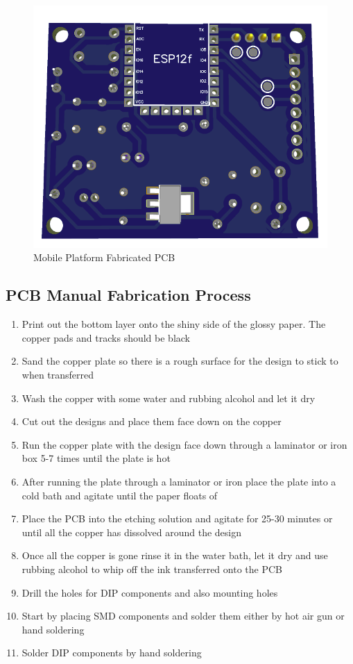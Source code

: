 
\begin{figure}[H]
    \centering
    \includegraphics[scale=0.5]{Figures/HMpcb_bottom.png}
    \caption{Mobile Platform Fabricated PCB}
    \label{fig:mobileplatformfabricatedpcb}
\end{figure}

\subsection{PCB Manual Fabrication Process}
\label{sec:PCBfab}
\begin{enumerate}
    \item Print out the bottom layer onto the shiny side of the glossy paper. The copper pads and tracks should be black
    \item Sand the copper plate so there is a rough surface for the design to stick to when transferred
    \item Wash the copper with some water and rubbing alcohol and let it dry
    \item Cut out the designs and place them face down on the copper
    \item Run the copper plate with the design face down through a laminator or iron box 5-7 times until the plate is hot
    \item After running the plate through a laminator or iron place the plate into a cold bath and agitate until the paper floats of
    \item Place the PCB into the etching solution and agitate for 25-30 minutes or until all the copper has dissolved around the design
    \item Once all the copper is gone rinse it in the water bath, let it dry and use rubbing alcohol to whip off the ink transferred onto the PCB
    \item Drill the holes for DIP components and also mounting holes
    \item Start by placing SMD components and solder them either by hot air gun or hand soldering
    \item Solder DIP components by hand soldering
\end{enumerate}


